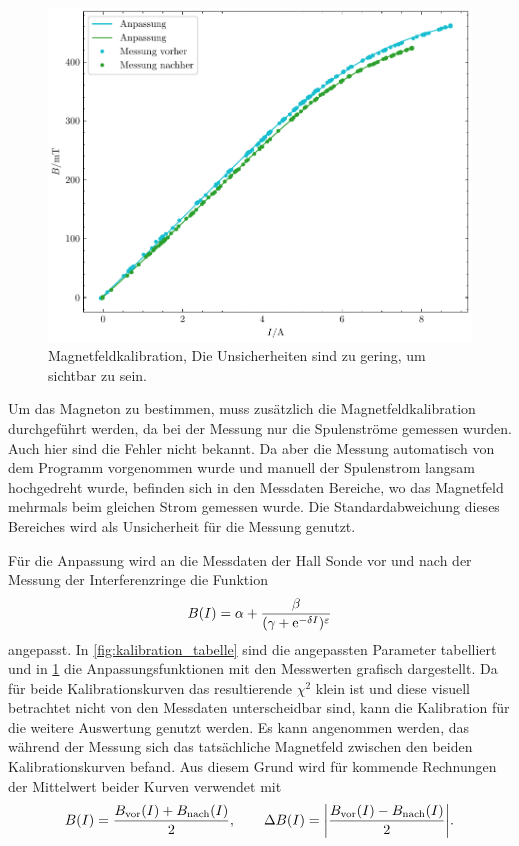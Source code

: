 \begin{figure}[htb]
    \centering
    \includegraphics[width=.6\linewidth]{../figs/BFeld-Kalibrationskurve}
    \caption{Magnetfeldkalibration, Die Unsicherheiten sind zu gering, um sichtbar zu sein.}
    \label{fig:bfield_kalibration}
\end{figure}

Um das Magneton zu bestimmen, muss zusätzlich die Magnetfeldkalibration durchgeführt werden, da 
bei der Messung nur die Spulenströme gemessen wurden. Auch hier sind die Fehler nicht bekannt. 
Da aber die Messung automatisch von dem Programm vorgenommen wurde und manuell der Spulenstrom 
langsam hochgedreht wurde, befinden sich in den Messdaten Bereiche, wo das Magnetfeld
mehrmals beim gleichen Strom gemessen wurde. Die Standardabweichung dieses Bereiches 
wird als Unsicherheit für die Messung genutzt.


Für die Anpassung wird an die Messdaten der Hall Sonde vor und nach der Messung der Interferenzringe 
die Funktion 
\begin{equation*}
    B(I) = \alpha + \frac{\beta}{(\gamma + \mathrm e^{-\delta I})^\varepsilon}
\end{equation*}
angepasst. In \cref{fig:kalibration_tabelle} sind die angepassten Parameter tabelliert 
und in \cref{fig:bfield_kalibration} die Anpassungsfunktionen mit den Messwerten 
grafisch dargestellt. Da für beide Kalibrationskurven das resultierende $\chi^2$
klein ist und diese visuell betrachtet nicht von den Messdaten unterscheidbar sind,
kann die Kalibration für die weitere Auswertung genutzt werden. Es kann angenommen werden,
das während der Messung sich das tatsächliche Magnetfeld zwischen den beiden Kalibrationskurven
befand. Aus diesem Grund wird für kommende Rechnungen der Mittelwert beider 
Kurven verwendet mit 
\[B(I) = \frac{B_\mathrm{vor}(I) + B_\mathrm{nach}(I)}{2}, 
\qquad \Delta B(I) = \abs{\frac{B_\mathrm{vor}(I) - B_\mathrm{nach}(I)}{2}}.\]

